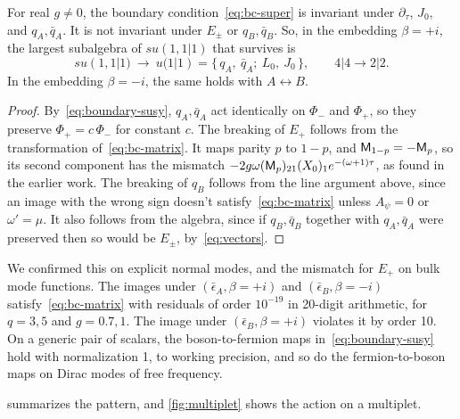 \begin{proposition}\label{prop:breaking}
For real $g\neq0$, the boundary condition~\eqref{eq:bc-super} is invariant under $\partial_\tau$, $J_0$, and $q_A,\bar q_A$. It is not invariant under $E_\pm$ or $q_B,\bar q_B$. So, in the embedding $\beta=+i$, the largest subalgebra of $su(1,1|1)$ that survives is
\begin{equation}\label{eq:breaking}
su(1,1|1)\ \longrightarrow\ u(1|1)=\big\{\,q_A,\ \bar q_A;\ L_0,\ J_0\,\big\},\qquad 4|4\to2|2.
\end{equation}
In the embedding $\beta=-i$, the same holds with $A\leftrightarrow B$.
\end{proposition}

\begin{proof}
By~\eqref{eq:boundary-susy}, $q_A,\bar q_A$ act identically on $\Phi_-$ and $\Phi_+$, so they preserve $\Phi_+=c\,\Phi_-$ for constant $c$. The breaking of $E_+$ follows from the transformation of~\eqref{eq:bc-matrix}. It maps parity $p$ to $1-p$, and $\mathsf{M}_{1-p}=-\mathsf{M}_p$, so its second component has the mismatch $-2g\omega(\mathsf{M}_p)_{21}(X_0)_1e^{-(\omega+1)\tau}$, as found in the earlier work. The breaking of $q_B$ follows from the line argument above, since an image with the wrong sign doesn't satisfy~\eqref{eq:bc-matrix} unless $A_\psi=0$ or $\omega'=\mu$. It also follows from the algebra, since if $q_B,\bar q_B$ together with $q_A,\bar q_A$ were preserved then so would be $E_\pm$, by~\eqref{eq:vectors}.
\end{proof}

We confirmed this on explicit normal modes, and the mismatch for $E_+$ on bulk mode functions. The images under $(\bar\epsilon_A,\beta=+i)$ and $(\bar\epsilon_B,\beta=-i)$ satisfy~\eqref{eq:bc-matrix} with residuals of order $10^{-19}$ in 20-digit arithmetic, for $q=3,5$ and $g=0.7,1$. The image under $(\bar\epsilon_B,\beta=+i)$ violates it by order 10. On a generic pair of scalars, the boson-to-fermion maps in~\eqref{eq:boundary-susy} hold with normalization 1, to working precision, and so do the fermion-to-boson maps on Dirac modes of free frequency.

 summarizes the pattern, and \cref{fig:multiplet} shows the action on a multiplet.

